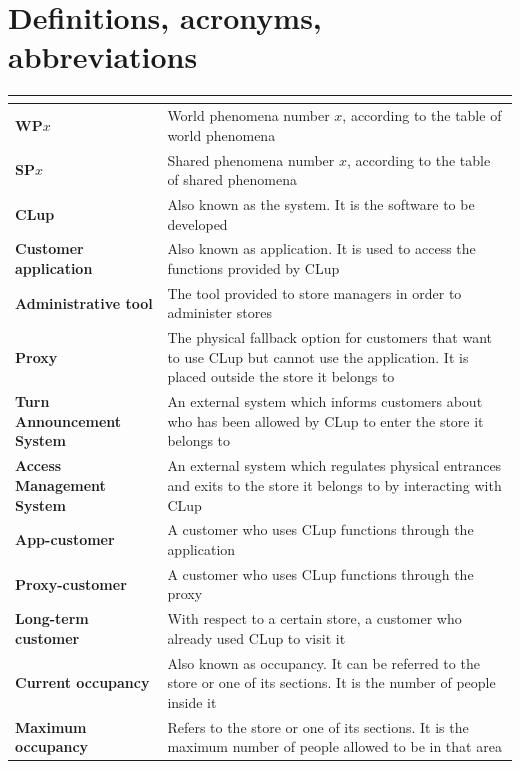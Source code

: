 \documentclass[a4paper,oneside,11pt]{book}   %
\begin{document}
    \section{Definitions, acronyms, abbreviations}
    \begin{longtable}[c] { |>{\bfseries{}}C{0.25\textwidth}|H{0.55\textwidth}| }
        \hline
         \\
        \hline
        WP\boldmath$x$ & World phenomena number $x$, according to the table of world phenomena \\ \hline
        SP\boldmath$x$ & Shared phenomena number $x$, according to the table of shared phenomena \\ \hline
        CLup & Also known as the system. It is the software to be developed \\ \hline
        Customer application & Also known as application. It is used to access the functions provided by CLup \\ \hline
        Administrative tool & The tool provided to store managers in order to administer stores \\ \hline
        Proxy & The physical fallback option for customers that want to use CLup but cannot use the application. It is placed outside the store it belongs to \\ \hline
        Turn Announcement System & An external system which informs customers about who has been allowed by CLup to enter the store it belongs to\\ \hline
        Access Management System & An external system which regulates physical entrances and exits to the store it belongs to by interacting with CLup \\ \hline
        App-customer & A customer who uses CLup functions through the application \\ \hline
        Proxy-customer & A customer who uses CLup functions through the proxy \\ \hline
        Long-term customer & With respect to a certain store, a customer who already used CLup to visit it \\ \hline
        Current occupancy & Also known as occupancy. It can be referred to the store or one of its sections. It is the number of people inside it \\ \hline
        Maximum occupancy & Refers to the store or one of its sections. It is the maximum number of people allowed to be in that area \\ \hline

\end{longtable}
\end{document}
